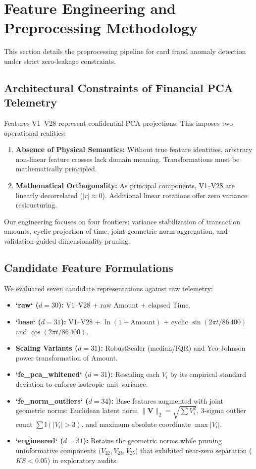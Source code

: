 \section{Feature Engineering and Preprocessing Methodology}
\label{sec:features}

This section details the preprocessing pipeline for card fraud anomaly detection under strict zero-leakage constraints.

\subsection{Architectural Constraints of Financial PCA Telemetry}
Features V1--V28 represent confidential PCA projections. This imposes two operational realities:
\begin{enumerate}
    \item \textbf{Absence of Physical Semantics:} Without true feature identities, arbitrary non-linear feature crosses lack domain meaning. Transformations must be mathematically principled.
    \item \textbf{Mathematical Orthogonality:} As principal components, V1--V28 are linearly decorrelated ($|r| \approx 0$). Additional linear rotations offer zero variance restructuring.
\end{enumerate}
Our engineering focuses on four frontiers: variance stabilization of transaction amounts, cyclic projection of time, joint geometric norm aggregation, and validation-guided dimensionality pruning.

\subsection{Candidate Feature Formulations}
We evaluated seven candidate representations against raw telemetry:
\begin{itemize}
    \item \textbf{`raw` ($d=30$):} V1--V28 + raw Amount + elapsed Time.
    \item \textbf{`base` ($d=31$):} V1--V28 + $\ln(1 + \text{Amount})$ + cyclic $\sin(2\pi t / 86\,400)$ and $\cos(2\pi t / 86\,400)$.
    \item \textbf{Scaling Variants ($d=31$):} RobustScaler (median/IQR) and Yeo-Johnson power transformation of Amount.
    \item \textbf{`fe_pca_whitened` ($d=31$):} Rescaling each $V_i$ by its empirical standard deviation to enforce isotropic unit variance.
    \item \textbf{`fe_norm_outliers` ($d=34$):} Base features augmented with joint geometric norms: Euclidean latent norm $\|\mathbf{V}\|_2 = \sqrt{\sum V_i^2}$, 3-sigma outlier count $\sum \mathbb{I}(|V_i| > 3)$, and maximum absolute coordinate $\max |V_i|$.
    \item \textbf{`engineered` ($d=31$):} Retains the geometric norms while pruning uninformative components ($V_{22}, V_{23}, V_{25}$) that exhibited near-zero separation ($KS < 0.05$) in exploratory audits.
\end{itemize}

